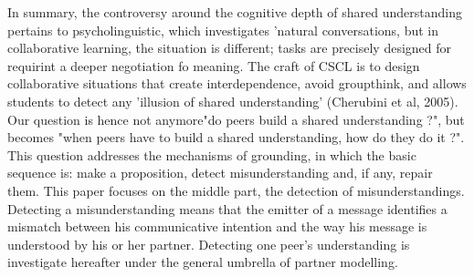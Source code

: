 \documentclass[natbib]{svjour3}
\begin{document}
%
%
%

\vspace{2em}
In summary, the controversy around the cognitive depth of shared understanding pertains to psycholinguistic, which investigates 'natural conversations, but  in collaborative learning, the situation is different; tasks are precisely designed for requirint a deeper negotiation fo meaning.  The craft of CSCL is to design collaborative situations that create interdependence, avoid groupthink, and allows students to detect any 'illusion of shared understanding' (Cherubini et al, 2005). Our question is hence not  anymore"do peers build a shared understanding ?", but becomes "when peers have to build a shared understanding, how do they do it ?".  This question addresses the mechanisms of grounding, in which the basic sequence is: make a proposition, detect misunderstanding and, if any, repair them.  This paper focuses on the middle part, the detection of misunderstandings.  Detecting a misunderstanding means that the emitter of a message identifies a mismatch between his communicative intention and the way his message is understood by his or her partner. Detecting one peer's understanding is investigate hereafter under the general umbrella of partner modelling.
\end{document}
